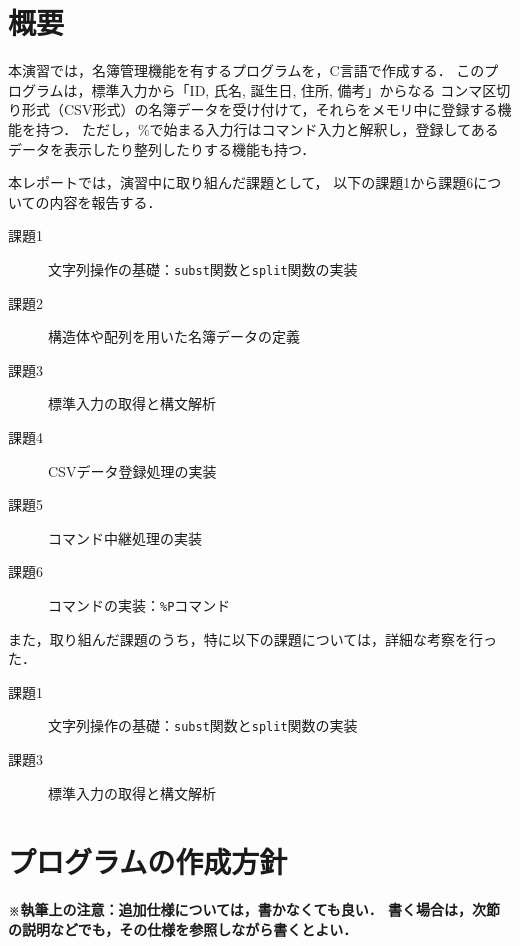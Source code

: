 \section{概要} \label{sec:1}

本演習では，名簿管理機能を有するプログラムを，C言語で作成する．
このプログラムは，標準入力から「ID, 氏名, 誕生日, 住所, 備考」からなる
コンマ区切り形式（CSV形式）の名簿データを受け付けて，それらをメモリ中に登録する機能を持つ．
ただし，\%で始まる入力行はコマンド入力と解釈し，登録してあるデータを表示したり整列したりする機能も持つ．

本レポートでは，演習中に取り組んだ課題として，
以下の課題1から課題6についての内容を報告する．
%
\begin{description}
  \item[課題1] 文字列操作の基礎：\verb|subst|関数と\verb|split|関数の実装
  \item[課題2] 構造体や配列を用いた名簿データの定義
  \item[課題3] 標準入力の取得と構文解析
  \item[課題4] CSVデータ登録処理の実装
  \item[課題5] コマンド中継処理の実装
  \item[課題6] コマンドの実装：\verb|%P|コマンド
\end{description}
%
また，取り組んだ課題のうち，特に以下の課題については，詳細な考察を行った．
%
\begin{description}
  \item[課題1] 文字列操作の基礎：\verb|subst|関数と\verb|split|関数の実装
  \item[課題3] 標準入力の取得と構文解析
\end{description}


\section{プログラムの作成方針} \label{sec:2}
\textbf{\small※執筆上の注意：追加仕様については，書かなくても良い．
    書く場合は，次節の説明などでも，その仕様を参照しながら書くとよい．\\}


